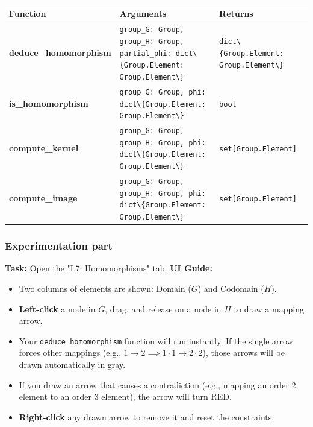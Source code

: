 \documentclass[11pt]{article}
\begin{document}
\begin{center}
\renewcommand{\arraystretch}{1.5}
\begin{tabularx}{\textwidth}{@{} >{\bfseries}l >{\hsize=1.26\hsize}X >{\hsize=0.74\hsize}X @{}}
\toprule
Function & Arguments & Returns \\ \midrule
deduce\_homomorphism & \lstinline|group_G: Group, group_H: Group, partial_phi: dict\{Group.Element: Group.Element\}| & \lstinline|dict\{Group.Element: Group.Element\}| \\
is\_homomorphism & \lstinline|group_G: Group, phi: dict\{Group.Element: Group.Element\}| & \lstinline|bool| \\
compute\_kernel & \lstinline|group_G: Group, group_H: Group, phi: dict\{Group.Element: Group.Element\}| & \lstinline|set[Group.Element]| \\
compute\_image & \lstinline|group_G: Group, group_H: Group, phi: dict\{Group.Element: Group.Element\}| & \lstinline|set[Group.Element]| \\
\bottomrule
\end{tabularx}
\end{center}

\subsubsection*{Experimentation part}
\textbf{Task:} Open the "L7: Homomorphisms" tab.
\textbf{UI Guide:} 
\begin{itemize}
    \item Two columns of elements are shown: Domain ($G$) and Codomain ($H$).
    \item \textbf{Left-click} a node in $G$, drag, and release on a node in $H$ to draw a mapping arrow.
    \item Your \lstinline|deduce_homomorphism| function will run instantly. If the single arrow forces other mappings (e.g., $1 \to 2 \implies 1\cdot 1 \to 2\cdot 2$), those arrows will be drawn automatically in gray.
    \item If you draw an arrow that causes a contradiction (e.g., mapping an order 2 element to an order 3 element), the arrow will turn RED.
    \item \textbf{Right-click} any drawn arrow to remove it and reset the constraints.
\end{itemize}
\end{document}
